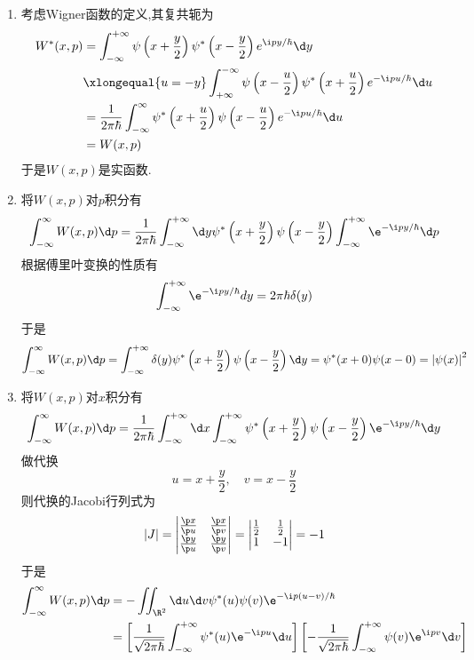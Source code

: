 \documentclass{ctexart}
\begin{document}
\begin{solution}
\begin{enumerate}[label=\tbf{\arabic*.}]
    \item 考虑Wigner函数的定义,其复共轭为
    \[\begin{aligned}
        W^\ast(x,p)
        &=\int_{-\infty}^{+\infty}\psi\left(x + \frac{y}{2}\right) \psi^\ast\left(x - \frac{y}{2}\right) e^{\i p y / \hbar}\d y\\
        &\xlongequal{u=-y}\int_{+\infty}^{-\infty}\psi\left(x - \frac{u}{2}\right) \psi^\ast\left(x + \frac{u}{2}\right) e^{-\i p u / \hbar}\d u\\
        &=\frac{1}{2\pi\hbar} \int_{-\infty}^{\infty} \psi^*\left(x + \frac{u}{2}\right) \psi\left(x - \frac{u}{2}\right) e^{-\i p u / \hbar}\d u\\
        &=W(x,p)
    \end{aligned}\]
    于是$W(x,p)$是实函数.
    \item 将$W(x,p)$对$p$积分有
    \[\int_{-\infty}^{\infty} W(x,p)\d p=\dfrac{1}{2\pi\hbar}\int_{-\infty}^{+\infty}\d y\psi^*\left(x + \frac{y}{2}\right) \psi\left(x - \frac{y}{2}\right)\int_{-\infty}^{+\infty}\e^{-\i py/\hbar}\d p\]
    根据傅里叶变换的性质有
    \[\int_{-\infty}^{+\infty}\e^{-\i py/\hbar}d y=2\pi\hbar\delta(y)\]
    于是
    \[\int_{-\infty}^{\infty} W(x,p)\d p=\int_{-\infty}^{+\infty}\delta(y)\psi^*\left(x + \frac{y}{2}\right) \psi\left(x - \frac{y}{2}\right)\d y=\psi^\ast(x+0)\psi(x-0)=\left|\psi(x)\right|^2\]
    \item 将$W(x,p)$对$x$积分有
    \[\int_{-\infty}^{\infty} W(x,p)\d p=\dfrac{1}{2\pi\hbar}\int_{-\infty}^{+\infty}\d x\int_{-\infty}^{+\infty}\psi^*\left(x + \frac{y}{2}\right) \psi\left(x - \frac{y}{2}\right)\e^{-\i py/\hbar}\d y\]
    做代换
    \[u=x+\dfrac y2,\quad v=x-\dfrac y2\]
    则代换的Jacobi行列式为
    \[|J|=\begin{vmatrix}
        \frac{\p x}{\p u}&\frac{\p x}{\p v}\\
        \frac{\p y}{\p u}&\frac{\p y}{\p v}
    \end{vmatrix}=\begin{vmatrix}
        \frac12&\frac12\\
        1&-1
    \end{vmatrix}=-1\]
    于是
    \[\begin{aligned}
        \int_{-\infty}^{\infty} W(x,p)\d p
        &=-\iint_{\R^2}\d u\d v\psi^\ast(u)\psi(v)\e^{-\i p(u-v)/\hbar}\\
        &=\left[\dfrac{1}{\sqrt{2\pi\hbar}}\int_{-\infty}^{+\infty}\psi^\ast(u)\e^{-\i p u}\d u\right]\left[-\dfrac{1}{\sqrt{2\pi\hbar}}\int_{-\infty}^{+\infty}\psi(v)\e^{\i p v}\d v\right]\\

\end{aligned}\]
\end{enumerate}
\end{solution}
\end{document}
